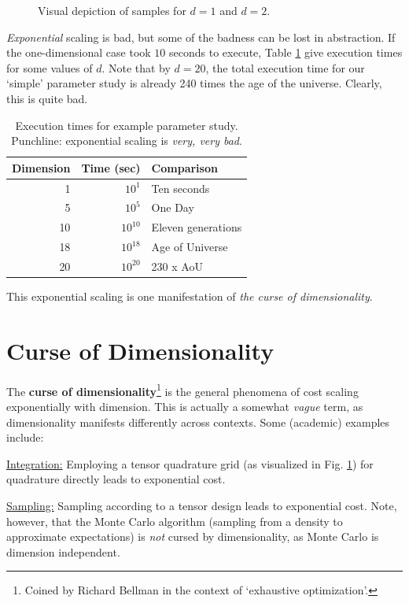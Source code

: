 \documentclass{article}
\begin{document}
\begin{figure}[!ht]
\begin{minipage}{0.45\textwidth}
  \end{minipage}
  \caption{Visual depiction of samples for $d=1$ and $d=2$.}
  \label{fig:samples}
\end{figure}

\emph{Exponential} scaling is bad, but some of the badness can be lost in
abstraction. If the one-dimensional case took $10$ seconds to execute, Table
\ref{tab:exponential} give execution times for some values of $d$. Note that by
$d=20$, the total execution time for our `simple' parameter study is already 240
times the age of the universe. Clearly, this is quite bad.

\begin{table}[!ht]
  \centering
  \begin{tabular}{r|r|l}
  \hline
  Dimension & Time (sec) & Comparison\\
  \hline
  1 & $10^{1}$ & Ten seconds\\
  \hline
  5 & $10^{5}$ & One Day\\
  \hline
  10 & $10^{10}$ & Eleven generations\\
  \hline
  18 & $10^{18}$ & Age of Universe\\
  \hline
  20 & $10^{20}$ & 230 x AoU\\
  \hline
  \end{tabular}
  \caption{Execution times for example parameter study. Punchline: exponential
    scaling is \emph{very, very bad}.}
  \label{tab:exponential}
\end{table}

This exponential scaling is one manifestation of \emph{the curse of
  dimensionality}.

\section{Curse of Dimensionality}
The \textbf{curse of dimensionality}\footnote{Coined by Richard Bellman in the
  context of `exhaustive optimization'.} is the general phenomena of cost
scaling exponentially with dimension. This is actually a somewhat \emph{vague}
term, as dimensionality manifests differently across
contexts.\cite{donoho2000high} Some (academic) examples include:

\bigskip\noindent\underline{Integration:} Employing a tensor quadrature grid (as
visualized in Fig. \ref{fig:samples}) for quadrature directly leads to
exponential cost.

\bigskip\noindent\underline{Sampling:} Sampling according to a tensor design
leads to exponential cost. Note, however, that the Monte Carlo algorithm
(sampling from a density to approximate expectations) is \emph{not} cursed by
dimensionality, as Monte Carlo is dimension
independent.\cite{owen2013montecarlo}
\end{document}
